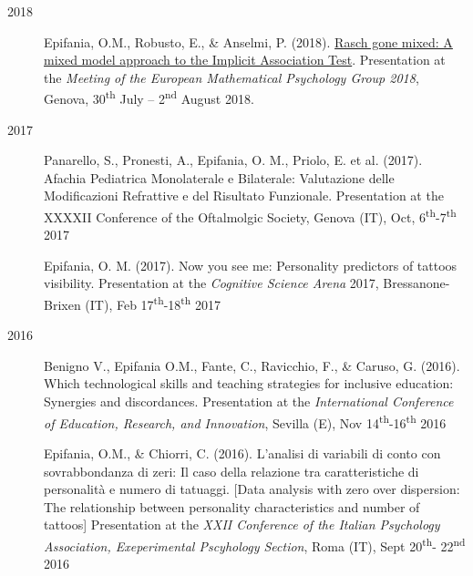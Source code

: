 \documentclass[letterpaper,12pt]{article}
\begin{document}
\begin{description}
	\item[2018] 
	\item[] 	Epifania, O.M., Robusto, E., \& Anselmi, P. (2018). \href{https://ottaviae.github.io/presentations/2018/empg2018.pdf}{Rasch gone mixed: A mixed model approach to the Implicit Association Test}. Presentation at the \emph{Meeting of the European Mathematical Psychology Group 2018}, Genova, 30\textsuperscript{th} July – 2\textsuperscript{nd} August 2018.
	
		\item[2017] 
	\item[] 	Panarello, S., Pronesti, A., Epifania, O. M., Priolo, E. et al. (2017). Afachia Pediatrica Monolaterale e Bilaterale: Valutazione delle Modificazioni Refrattive e del Risultato Funzionale. Presentation at the XXXXII Conference of the Oftalmolgic Society, Genova (IT), Oct, 6\textsuperscript{th}-7\textsuperscript{th} 2017
	
	\item[] 	Epifania, O. M. (2017). Now you see me: Personality predictors of tattoos visibility. Presentation at the \emph{Cognitive Science Arena} 2017, Bressanone-Brixen (IT), Feb 17\textsuperscript{th}-18\textsuperscript{th} 2017
	
		\item[2016] 
	\item[] 	Benigno V., Epifania O.M., Fante, C., Ravicchio, F., \& Caruso, G. (2016). Which technological skills and teaching strategies for inclusive education: Synergies and discordances. Presentation at the \emph{International Conference of Education, Research, and Innovation}, Sevilla (E), Nov  14\textsuperscript{th}-16\textsuperscript{th} 2016
	
	\item[] 	Epifania, O.M., \& Chiorri, C. (2016). L’analisi di variabili di conto con sovrabbondanza di zeri: Il caso della relazione tra caratteristiche di personalità e numero di tatuaggi. [Data analysis with zero over dispersion: The relationship between personality characteristics and number of tattoos] Presentation at the \emph{XXII Conference of the Italian Psychology Association, Exeperimental Pscyhology Section}, Roma (IT), Sept 20\textsuperscript{th}- 22\textsuperscript{nd} 2016
	
\end{description}
\end{document}
